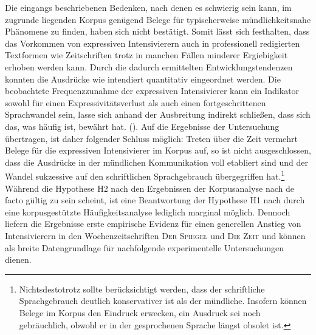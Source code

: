 Die eingangs beschriebenen Bedenken, nach denen es schwierig sein kann, im zugrunde liegenden Korpus genügend Belege für typischerweise mündlichkeitsnahe Phänomene zu finden, haben sich nicht bestätigt. Somit lässt sich festhalten, dass das Vorkommen von expressiven Intensivierern auch in professionell redigierten Textformen wie Zeitschriften trotz in manchen Fällen minderer Ergiebigkeit erhoben werden kann. Durch die dadurch ermittelten Entwicklungstendenzen konnten die Ausdrücke wie intendiert quantitativ eingeordnet werden. Die beobachtete Frequenzzunahme der expressiven Intensivierer kann ein Indikator sowohl für einen Expressivitätsverlust als auch einen fortgeschrittenen Sprachwandel sein, lasse sich \glqq{}anhand der Ausbreitung indirekt schließen, dass sich das, was häufig ist, bewährt hat.\grqq{} (\citealt[70]{Perkuhn.2012}). Auf die Ergebnisse der Untersuchung übertragen, ist daher folgender Schluss möglich: Treten über die Zeit vermehrt Belege für die expressiven Intensivierer im Korpus auf, so ist nicht ausgeschlossen, dass die Ausdrücke in der mündlichen Kommunikation voll etabliert sind und der Wandel sukzessive auf den schriftlichen Sprachgebrauch übergegriffen hat.\footnote{Nichtsdestotrotz sollte berücksichtigt werden, dass der schriftliche Sprachgebrauch deutlich konservativer ist als der mündliche. Insofern können Belege im Korpus den Eindruck erwecken, ein Ausdruck sei noch gebräuchlich, obwohl er in der gesprochenen Sprache längst obsolet ist.} Während die Hypothese H2 nach \citet[274]{Baumgarten.1908} den Ergebnissen der Korpusanalyse nach de facto gültig zu sein scheint, ist eine Beantwortung der Hypothese H1 nach \citet[2]{Hauschild.1899} durch eine korpusgestützte Häufigkeitsanalyse lediglich marginal möglich. Dennoch liefern die Ergebnisse erste empirische Evidenz für einen generellen Anstieg von Intensivierern in den Wochenzeitschriften \textsc{Der Spiegel} und \textsc{Die Zeit} und können als breite Datengrundlage für nachfolgende experimentelle Untersuchungen dienen.

